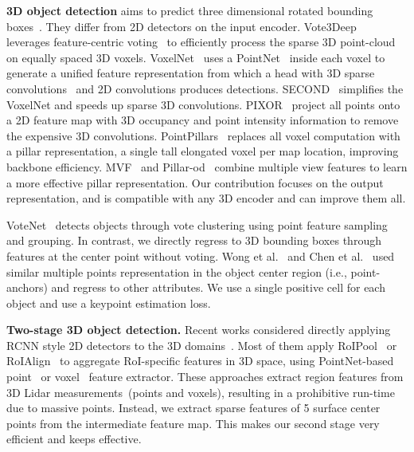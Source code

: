 \documentclass[final]{cvpr}
\begin{document}
\noindent
\textbf{3D object detection}  
aims to predict three dimensional rotated bounding boxes~\cite{yan2018second, pillar, std, qi2018frustum, yang20203dssd, liang2019multi, kitti}.
They differ from 2D detectors on the input encoder.
Vote3Deep~\cite{vote_3deep} leverages feature-centric voting~\cite{wang2015voting} to efficiently process the sparse 3D point-cloud on equally spaced 3D voxels.
VoxelNet~\cite{voxelnet} uses a PointNet~\cite{qi2017pointnet} inside each voxel to generate a unified feature representation from which a head with 3D sparse convolutions~\cite{sparse_conv} and 2D convolutions produces detections.
SECOND~\cite{yan2018second} simplifies the VoxelNet and speeds up sparse 3D convolutions. 
PIXOR~\cite{pixor} project all points onto a 2D feature map with 3D occupancy and point intensity information to remove the expensive 3D convolutions.
PointPillars~\cite{pillar} replaces all voxel computation with a pillar representation, a single tall elongated voxel per map location, improving backbone efficiency.
MVF~\cite{mvf} and Pillar-od~\cite{wang2020pillar} combine multiple view features to learn a more effective pillar representation. 
Our contribution focuses on the output representation, and is compatible with any 3D encoder and can improve them all.

VoteNet~\cite{votenet} detects objects through vote clustering using point feature sampling and grouping. 
In contrast, we directly regress to 3D bounding boxes through features at the center point without voting.  
Wong et al.~\cite{wong2019identifying} and Chen et al.~\cite{chen2019hotspot} used similar multiple points representation in the object center region (i.e., point-anchors) and regress to other attributes.
We use a single positive cell for each object and use a keypoint estimation loss.

\noindent
\textbf{Two-stage 3D object detection.} 
Recent works considered directly applying RCNN style 2D detectors to the 3D domains~\cite{pvrcnn, PartA, shi2019pointrcnn, std, fast_pointrcnn}. 
Most of them apply RoIPool~\cite{ren2015faster} or RoIAlign~\cite{he2017mask} to aggregate RoI-specific features in 3D space, using PointNet-based point~\cite{shi2019pointrcnn} or voxel~\cite{pvrcnn} feature extractor. 
These approaches extract region features from 3D Lidar measurements~(points and voxels), 
resulting in a prohibitive run-time due to massive points.
Instead, we extract sparse features of 5 surface center points from the intermediate feature map.
This makes our second stage very efficient and keeps effective.
\end{document}
